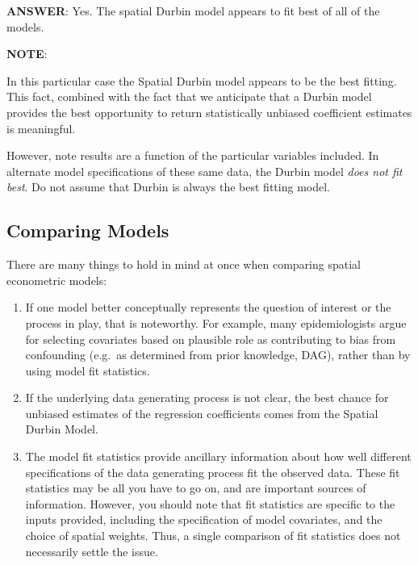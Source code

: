 \documentclass[
]{book}
\providecommand{\tightlist}{%
  \setlength{\itemsep}{0pt}\setlength{\parskip}{0pt}}
\newenvironment{rmdcaution}[1]
  {
  \begin{itemize}
  \renewcommand{\labelitemi}{
    \raisebox{-.7\height}[0pt][0pt]{
      {\setkeys{Gin}{width=3em,keepaspectratio}\texttt{[image: images/\#1]}}
    }
  }
  \setlength{\fboxsep}{1em}
  \begin{caution}
  \item
  }
  {
  \end{caution}
  \end{itemize}
  }
\begin{document}
\textbf{ANSWER}: Yes. The spatial Durbin model appears to fit best of all of the models.

\begin{rmdcaution}{caution}
\textbf{NOTE}:

In this particular case the Spatial Durbin model appears to be the best fitting. This fact, combined with the fact that we anticipate that a Durbin model provides the best opportunity to return statistically unbiased coefficient estimates is meaningful.

However, note results are a function of the particular variables included. In alternate model specifications of these same data, the Durbin model \emph{does not fit best}. Do not assume that Durbin is always the best fitting model.

\end{rmdcaution}

\hypertarget{comparing-models}{%
\subsection{Comparing Models}\label{comparing-models}}

There are many things to hold in mind at once when comparing spatial econometric models:

\begin{enumerate}
\def\labelenumi{\arabic{enumi}.}
\tightlist
\item
  If one model better conceptually represents the question of interest or the process in play, that is noteworthy. For example, many epidemiologists argue for selecting covariates based on plausible role as contributing to bias from confounding (e.g.~as determined from prior knowledge, DAG), rather than by using model fit statistics.
\item
  If the underlying data generating process is not clear, the best chance for unbiased estimates of the regression coefficients comes from the Spatial Durbin Model.
\item
  The model fit statistics provide ancillary information about how well different specifications of the data generating process fit the observed data. These fit statistics may be all you have to go on, and are important sources of information. However, you should note that fit statistics are specific to the inputs provided, including the specification of model covariates, and the choice of spatial weights. Thus, a single comparison of fit statistics does not necessarily settle the issue.
\end{enumerate}
\end{document}
